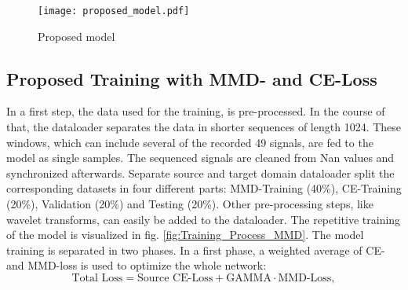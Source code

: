 \begin{figure}[H]
  \centering
  \texttt{[image: proposed\_model.pdf]}
  \caption {Proposed model} \label{fig:proposed_model}
\end{figure}


\subsection{Proposed Training with MMD- and CE-Loss} \label{sec:Proposed_training}

In a first step, the data used for the training, is pre-processed. In the course of that, the dataloader separates the data in shorter sequences of length 1024. These windows, which can include several of the recorded 49 signals, are fed to the model as single samples. The sequenced signals are cleaned from Nan values and synchronized afterwards. Separate source and target domain dataloader split the corresponding datasets in four different parts: MMD-Training (40\%), CE-Training (20\%), Validation (20\%) and Testing (20\%). Other pre-processing steps, like wavelet transforms, can easily be added to the dataloader. The repetitive training of the model is visualized in fig. \ref{fig:Training_Process_MMD}. The model training is separated in two phases. In a first phase, a weighted average of CE- and MMD-loss is used to optimize the whole network: 
\begin{equation}
    \mbox{Total Loss} = \mbox{Source CE-Loss} + \mbox{GAMMA} \cdot \mbox{MMD-Loss}, 
\end{equation}
